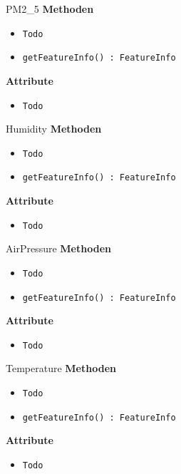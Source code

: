     \begin{Class}{PM2\_5}
        \textbf{Methoden}
        \begin{itemize}
            \item \texttt{Todo}
            \item \texttt{getFeatureInfo() : FeatureInfo}
        \end{itemize}
        
        \textbf{Attribute}
        \begin{itemize}
            \item \texttt{Todo}
        \end{itemize}
    \end{Class}

    \begin{Class}{Humidity}
        \textbf{Methoden}
        \begin{itemize}
            \item \texttt{Todo}
            \item \texttt{getFeatureInfo() : FeatureInfo}
        \end{itemize}
        
        \textbf{Attribute}
        \begin{itemize}
            \item \texttt{Todo}
        \end{itemize}
    \end{Class}

    \begin{Class}{AirPressure}
        \textbf{Methoden}
        \begin{itemize}
            \item \texttt{Todo}
            \item \texttt{getFeatureInfo() : FeatureInfo}
        \end{itemize}
        
        \textbf{Attribute}
        \begin{itemize}
            \item \texttt{Todo}
        \end{itemize}
    \end{Class}

    \begin{Class}{Temperature}
        \textbf{Methoden}
        \begin{itemize}
            \item \texttt{Todo}
            \item \texttt{getFeatureInfo() : FeatureInfo}
        \end{itemize}
        
        \textbf{Attribute}
        \begin{itemize}
            \item \texttt{Todo}
        \end{itemize}
    \end{Class}

